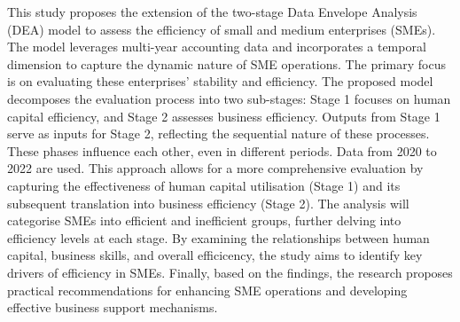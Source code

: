 
\begin{Abstrakt}
    This study proposes the extension of the two-stage Data Envelope Analysis (DEA) model to assess the efficiency of small and medium enterprises (SMEs). The model leverages multi-year accounting data and incorporates a temporal dimension to capture the dynamic nature of SME operations. The primary focus is on evaluating these enterprises' stability and efficiency. The proposed model decomposes the evaluation process into two sub-stages: Stage 1 focuses on human capital efficiency, and Stage 2 assesses business efficiency. Outputs from Stage 1 serve as inputs for Stage 2, reflecting the sequential nature of these processes. These phases influence each other, even in different periods. Data from 2020 to 2022 are used. This approach allows for a more comprehensive evaluation by capturing the effectiveness of human capital utilisation (Stage 1) and its subsequent translation into business efficiency (Stage 2). The analysis will categorise SMEs into efficient and inefficient groups, further delving into efficiency levels at each stage. By examining the relationships between human capital, business skills, and overall efficicency, the study aims to identify key drivers of efficiency in SMEs. Finally, based on the findings, the research proposes practical recommendations for enhancing SME operations and developing effective business support mechanisms.
\end{Abstrakt}



\clearpage